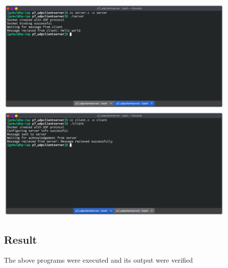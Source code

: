 \begin{center}
	\includegraphics[width=0.90\textwidth]{img/p8/ss1.png}
	\includegraphics[width=0.90\textwidth]{img/p8/ss2.png}
\end{center}


\subsection{Result}
The above programs were executed and its output were verified